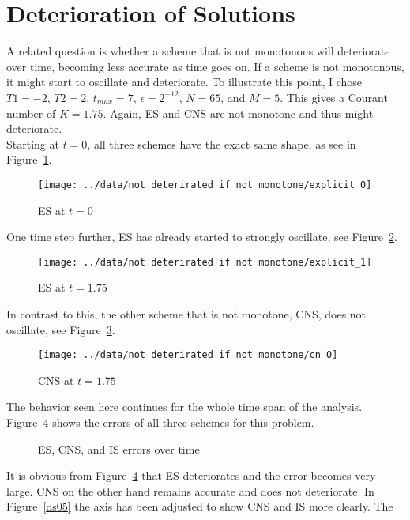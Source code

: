 \documentclass[a4paper, 12pt, reqno]{article}
\newcommand{\figref}[1]{Figure~\ref{#1}}
\begin{document}
\section{Deterioration of Solutions}

A related question is whether a scheme that is not monotonous will deteriorate
over time, becoming less accurate as time goes on. If a scheme is not monotonous,
it might start to oscillate and deteriorate. To illustrate this point, I chose
$T1=-2$, $T2=2$, $t_{max}=7$, $\epsilon = 2^{-12}$, $N=65$, and $M=5$. This 
gives a Courant
number of $K=1.75$. Again, ES and CNS are not monotone and thus might
deteriorate.\\
Starting at $t=0$, all three schemes have the exact same shape, as see in
\figref{ds01}.
\begin{figure}[H]
    \center
    \texttt{[image: ../data/not deterirated if not monotone/explicit\_0]}
    \vspace{-20pt}
    \caption{ES at $t=0$}
    \label{ds01}
\end{figure}
One time step further, ES has already started to strongly oscillate, see
\figref{ds02}.
\begin{figure}[H]
    \center
    \texttt{[image: ../data/not deterirated if not monotone/explicit\_1]}
    \vspace{-20pt}
    \caption{ES at $t=1.75$}
    \label{ds02}
\end{figure}
In contrast to this, the other scheme that is not monotone, CNS, does not
oscillate, see \figref{ds03}.
\begin{figure}[H]
    \center
    \texttt{[image: ../data/not deterirated if not monotone/cn\_0]}
    \vspace{-20pt}
    \caption{CNS at $t=1.75$}
    \label{ds03}
\end{figure}
The behavior seen here continues for the whole time span of the analysis.
\figref{ds04} shows the errors of all three schemes for this problem.
\begin{figure}[H]
    \center
    \vspace{-20pt}
    \caption{ES, CNS, and IS errors over time}
    \label{ds04}
\end{figure}
It is obvious from \figref{ds04} that ES deteriorates and the error becomes
very large. CNS on the other hand remains accurate and does not deteriorate. In
\figref{ds05} the axis has been adjusted to show CNS and IS more clearly. The
\end{document}
